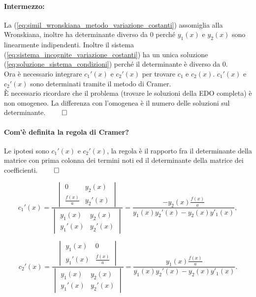 \paragraph{Intermezzo:} La (\ref{eq:simil_wronskiana_metodo_variazione_costanti}) assomiglia alla Wronskiana, inoltre ha determinante diverso da 0 perché $y_1(x)$ e $y_2(x)$ sono linearmente indipendenti. Inoltre il sistema (\ref{eq:sistema_incognite_variazione_costanti}) ha un unica soluzione (\ref{eq:soluzione_sistema_condizioni}) perché il determinante è diverso da 0.\\
Ora è necessario integrare $c_1'(x)$ e $c_2'(x)$ per trovare $c_1$ e $c_2(x)$. $c_1'(x)$ e $c_2'(x)$ sono determinati tramite il metodo di Cramer.\\
È necessario ricordare che il problema (trovare le soluzioni della EDO completa) è non omogeneo. La differenza con l'omogenea è il numero delle soluzioni sul determinante. $\qed$

\paragraph{Com'è definita la regola di Cramer?} Le ipotesi sono $c_1'(x)$ e $c_2'(x)$, la regola è il rapporto fra il determinante della matrice con prima colonna dei termini noti ed il determinante della matrice dei coefficienti. $\qed$

\begin{equation*}
	c_1'(x)=\frac{
	\begin{vmatrix}
		0 & y_2(x)\\
		\frac{f(x)}{a} & y_2'(x)
	\end{vmatrix}
	}{
	\begin{vmatrix}
		y_1(x) & y_2(x)\\
		y_1'(x) & y_2'(x)
	\end{vmatrix}
	} = \frac{-y_2(x)\frac{f(x)}{a}}{y_1(x)y_2'(x) - y_2(x) y'_1(x)},
\end{equation*}

\begin{equation*}
	c_2'(x)=\frac{
		\begin{vmatrix}
			y_1(x) & 0\\
			 y_1'(x) & \frac{f(x)}{a}
		\end{vmatrix}
	}{
		\begin{vmatrix}
			y_1(x) & y_2(x)\\
			y_1'(x) & y_2'(x)
		\end{vmatrix}
	} = \frac{y_1(x)\frac{f(x)}{a}}{y_1(x)y_2'(x) - y_2(x) y'_1(x)}.
\end{equation*}

